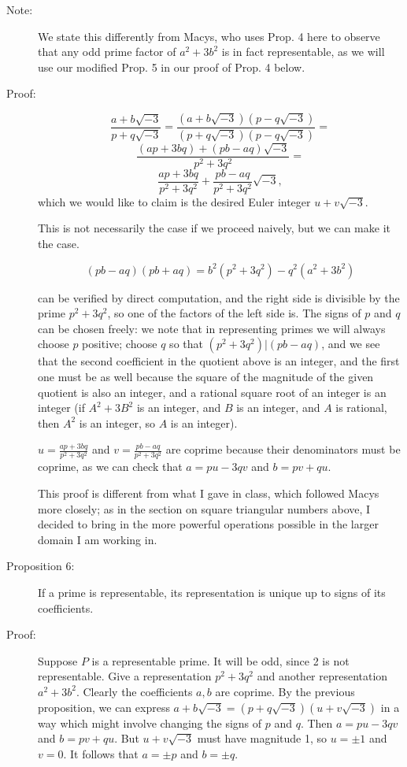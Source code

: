 \documentclass[12pt]{article}
\begin{document}
\begin{description}
\item[Note:]  We state this differently from Macys, who uses Prop. 4 here to observe that any odd prime factor of $a^2+3b^2$ is in fact representable, as we will use our modified Prop. 5 in our proof of Prop. 4 below.

\item[Proof:]  $$\frac{a+b\sqrt{-3}}{p+q\sqrt{-3}} =  \frac{(a+b\sqrt{-3})(p-q\sqrt{-3})}{(p+q\sqrt{-3})(p-q\sqrt{-3})} =$$
$$\frac{(ap+3bq)+(pb-aq)\sqrt{-3}}{p^2+3q^2}=$$
$$\frac{ap+3bq}{p^2+3q^2}+\frac{pb-aq}{p^2+3q^2}\sqrt{-3},$$
which we would like to claim is the desired Euler integer $u+v\sqrt{-3}$.

This is not necessarily the case if we proceed naively, but we can make it the case.

$$(pb-aq)(pb+aq)=b^2(p^2+3q^2)-q^2(a^2+3b^2)$$

can be verified by direct computation, and the right side is divisible by the prime $p^2+3q^2$, so one of the factors of the left side is.
The signs of $p$ and $q$ can be chosen freely:  we note that in representing primes we will always choose $p$ positive; choose $q$ so that
$(p^2+3q^2)|(pb-aq)$, and we see that the second coefficient in the quotient above is an integer, and the first one must be as well
because the square of the magnitude of the given quotient is also an integer, and a rational square root of an integer is an integer (if $A^2+3B^2$ is an integer, and $B$ is an integer, and $A$ is rational, then $A^2$ is an integer, so $A$ is an integer).

$u=\frac{ap+3bq}{p^2+3q^2}$ and $v=\frac{pb-aq}{p^2+3q^2}$ are coprime because their denominators must be coprime, as we can check
that $a=pu-3qv$ and $b=pv+qu$.

This proof is different from what I gave in class, which followed Macys more closely; as in the section on square triangular numbers above, I decided to bring in the more powerful operations possible in the larger domain I am working in.

\item[Proposition 6:]  If a prime is representable, its representation is unique up to signs of its coefficients.

\item[Proof:]  Suppose $P$ is a representable prime.  It will be odd, since 2 is not representable.  Give a representation $p^2+3q^2$
and another representation $a^2+3b^2$. Clearly the coefficients $a,b$ are coprime.   By the previous proposition, we can express $a+b\sqrt{-3}=(p+q\sqrt{-3})(u+v\sqrt{-3})$
in a way which might involve changing the signs of $p$ and $q$.  Then $a=pu-3qv$ and $b=pv+qu$.  But $u+v\sqrt{-3}$ must have magnitude 1,
so $u=\pm 1$ and $v=0$.  It follows that $a=\pm p$ and $b=\pm q$.


\end{description}
\end{document}
